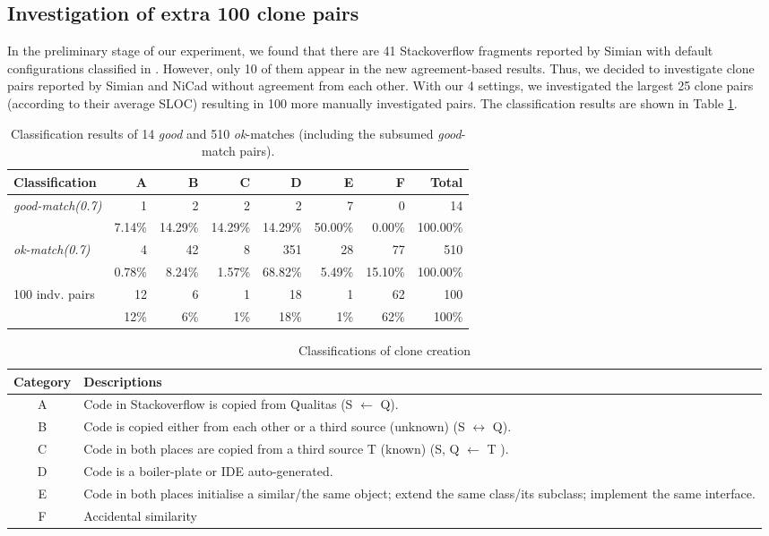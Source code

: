 \documentclass{IEEEtran}
\begin{document}
\subsection{Investigation of extra 100 clone pairs}
In the preliminary stage of our experiment, we found that there are 41 Stackoverflow fragments reported by Simian with default configurations classified in . However, only 10 of them appear in the new agreement-based results. Thus, we decided to investigate clone pairs reported by Simian and NiCad without agreement from each other. With our 4 settings, we investigated the largest 25 clone pairs (according to their average SLOC) resulting in 100 more manually investigated pairs. The classification results are shown in Table \ref{tab:classification}.


\begin{table}[H]
	\centering
	\caption{Classification results of 14 \textit{good} and 510 \textit{ok}-matches (including the subsumed \textit{good}-match pairs).}
	\label{tab:classification}
	\begin{tabular}{|l|r|r|r|r|r|r|r|}
		\hline 
		Classification & A & B & C & D & E & F & Total \\ 
		\hline 
		\multirow{2}{*}{\textit{good-match(0.7)}} & 1 & 2 & 2 & 2 & 7 & 0 & 14 \\ \cline{2-8}
		& 7.14\%	& 14.29\%	& 14.29\%	& 14.29\%	& 50.00\%	& 0.00\%	& 100.00\% \\ 
		\hline
		\multirow{2}{*}{\textit{ok-match(0.7)}} & 4 & 42 & 8 & 351 & 28 & 77 & 510 \\ \cline{2-8}
		& 0.78\%	& 8.24\%	&	1.57\%	&	68.82\%	&	5.49\%	&	15.10\%	&	100.00\%  \\ 
		\hline
		\multirow{2}{*}{100 indv. pairs} & 12 & 6 & 1 & 18 & 1 & 62 & 100 \\ \cline{2-8}
		& 12\%	& 6\%	&	1\%	&	18\%	&	1\%	&	62\%	&	100\%  \\ 
		\hline
	\end{tabular} 
\end{table}

\begin{table}[H]
	\centering
	\caption{Classifications of clone creation}
	\label{tab:classification_scheme}
	\begin{tabular}{|c|p{13cm}|}
		\hline 
		Category & Descriptions \\ 
		\hline 
		A & Code in Stackoverflow is copied from Qualitas (S $\leftarrow$ Q). \\ 
		\hline 
		B & Code is copied either from each other or a third source (unknown) (S $\leftrightarrow$ Q).
		\\ 
		\hline 
		C & Code in both places are copied from a third source T (known) (S, Q $\leftarrow$ T ).
		\\ 
		\hline 
		D & Code is a boiler-plate or IDE auto-generated.
		\\ 
		\hline 
		E & Code in both places initialise a similar/the same object; extend the same class/its subclass; implement the same interface.
		\\ 
		\hline 
		F & Accidental similarity  \\ 
		\hline 
	\end{tabular} 
\end{table}
\end{document}

